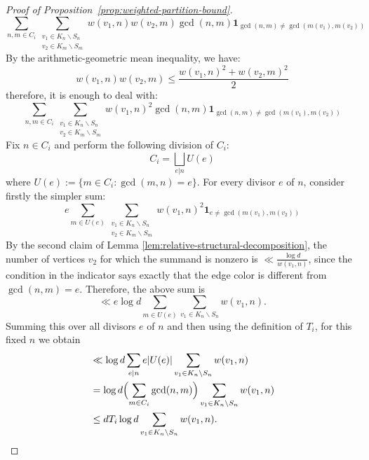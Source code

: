 \documentclass[11pt]{amsart}
\theoremstyle{remark}
\begin{document}
\begin{proof}[Proof of Proposition~\ref{prop:weighted-partition-bound}]
  \begin{equation}
    \sum_{n, m \in C_i} \sum_{\substack{v_1 \in K_n \backslash S_n \\ v_2 \in K_m \backslash S_m}}w(v_1, n) w(v_2, m) \gcd(n, m) \mathbf{1}_{\gcd(n,m) \neq \gcd(m(v_1), m(v_2))}
  \end{equation}
  By the arithmetic-geometric mean inequality, we have:
  \begin{equation}
    w(v_1, n) w(v_2, m) \leq \frac{w(v_1, n)^2 + w(v_2, m)^2}{2}
  \end{equation}
  therefore, it is enough to deal with:
  \begin{equation} \label{eq:1-epsilon-auxiliary-expression-standard-2} 
    \sum_{n, m \in C_i} \sum_{\substack{v_1 \in K_n \backslash S_n \\ v_2 \in K_m \backslash S_m}} w(v_1, n)^2 \gcd(n, m) \mathbf{1}_{\gcd(n,m) \neq \gcd(m(v_1), m(v_2))}
  \end{equation}
  Fix $n \in C_i$ and perform the following division of $C_i$:
  \begin{equation}
    C_i = \bigsqcup_{e | n} U(e)
  \end{equation}
  where $U(e) := \{ m \in C_i : \gcd(m, n) = e \}$. For every divisor $e$ of $n$, consider firstly the simpler sum:
  \begin{equation}
    e \sum_{m \in U(e)} \sum_{\substack{v_1 \in K_n \backslash S_n \\ v_2 \in K_m \backslash S_m}} w(v_1, n)^2 \mathbf{1}_{e \neq \gcd(m(v_1), m(v_2))}
  \end{equation}
  By the second claim of Lemma \ref{lem:relative-structural-decomposition}, the number of vertices $v_2$ for which the summand is nonzero is $\ll \frac{\log d}{w(v_1, n)}$, since the condition in the indicator says exactly that the edge color is different from $\gcd(n,m)=e$. Therefore, the above sum is
  \begin{equation}
    \ll e \log d \sum_{m \in U(e)} \sum_{v_1 \in K_n \backslash S_n} w(v_1, n).
  \end{equation}
  Summing this over all divisors $e$ of $n$ and then using the definition of $T_i$, for this fixed $n$ we obtain
  \begin{align}
    \notag
    &\ll \log d \sum_{e|n}e|U(e)|\sum_{v_1 \in K_n \backslash S_n}w(v_1,n)\\
    \notag
    &= \log d \Bigl(\sum_{m\in C_i}\gcd(n,m)\Bigr)\sum_{v_1 \in K_n \backslash S_n}w(v_1,n)\\
    &\leq dT_i\log d \sum_{v_1 \in K_n \backslash S_n}w(v_1,n).

\end{align}
\end{proof}
\end{document}
